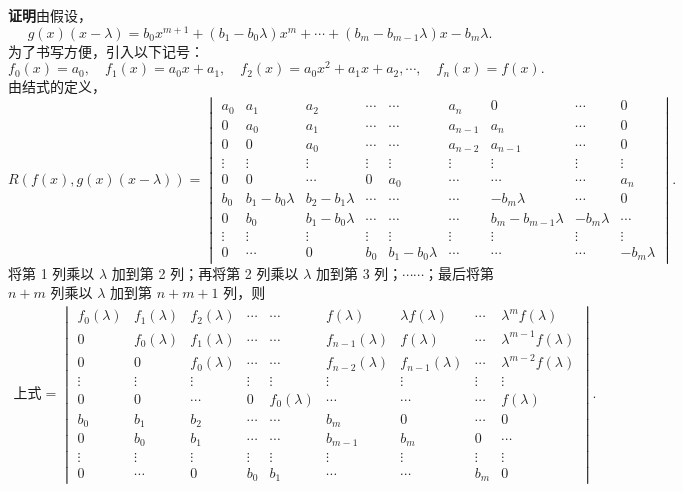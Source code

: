 \documentclass[UTF8, 12pt, fontset=fandol, oneside]{ctexart}
\begin{document}
\noindent\textbf{证明}\quad 由假设，
\[
g(x)(x-\lambda)=b_0x^{m+1}+(b_1-b_0\lambda)x^m+\cdots+(b_m-b_{m-1}\lambda)x-b_m\lambda.
\]
为了书写方便，引入以下记号：
\[
f_0(x)=a_0,\quad f_1(x)=a_0x+a_1,\quad f_2(x)=a_0x^2+a_1x+a_2,\cdots,\quad f_n(x)=f(x).
\]
由结式的定义，
\[
R(f(x),g(x)(x-\lambda))=
\begin{vmatrix}
a_0&a_1&a_2&\cdots&\cdots&a_n&0&\cdots&0\\
0&a_0&a_1&\cdots&\cdots&a_{n-1}&a_n&\cdots&0\\
0&0&a_0&\cdots&\cdots&a_{n-2}&a_{n-1}&\cdots&0\\
\vdots&\vdots&\vdots&\vdots&\vdots&\vdots&\vdots&\vdots&\vdots\\
0&0&\cdots&0&a_0&\cdots&\cdots&\cdots&a_n\\
b_0&b_1-b_0\lambda&b_2-b_1\lambda&\cdots&\cdots&\cdots&-b_m\lambda&\cdots&0\\
0&b_0&b_1-b_0\lambda&\cdots&\cdots&\cdots&b_m-b_{m-1}\lambda&-b_m\lambda&\cdots\\
\vdots&\vdots&\vdots&\vdots&\vdots&\vdots&\vdots&\vdots&\vdots\\
0&\cdots&0&b_0&b_1-b_0\lambda&\cdots&\cdots&\cdots&-b_m\lambda
\end{vmatrix}.
\]
将第 1 列乘以 $\lambda$ 加到第 2 列；再将第 2 列乘以 $\lambda$ 加到第 3 列；$\cdots\cdots$；最后将第 $n+m$ 列乘以 $\lambda$ 加到第 $n+m+1$ 列，则
\[
\begin{aligned}
\text{上式}=
\begin{vmatrix}
f_0(\lambda)&f_1(\lambda)&f_2(\lambda)&\cdots&\cdots&f(\lambda)&\lambda f(\lambda)&\cdots&\lambda^mf(\lambda)\\
0&f_0(\lambda)&f_1(\lambda)&\cdots&\cdots&f_{n-1}(\lambda)&f(\lambda)&\cdots&\lambda^{m-1}f(\lambda)\\
0&0&f_0(\lambda)&\cdots&\cdots&f_{n-2}(\lambda)&f_{n-1}(\lambda)&\cdots&\lambda^{m-2}f(\lambda)\\
\vdots&\vdots&\vdots&\vdots&\vdots&\vdots&\vdots&\vdots&\vdots\\
0&0&\cdots&0&f_0(\lambda)&\cdots&\cdots&\cdots&f(\lambda)\\
b_0&b_1&b_2&\cdots&\cdots&b_m&0&\cdots&0\\
0&b_0&b_1&\cdots&\cdots&b_{m-1}&b_m&0&\cdots\\
\vdots&\vdots&\vdots&\vdots&\vdots&\vdots&\vdots&\vdots&\vdots\\
0&\cdots&0&b_0&b_1&\cdots&\cdots&b_m&0
\end{vmatrix}.
\end{aligned}
\]
\end{document}
